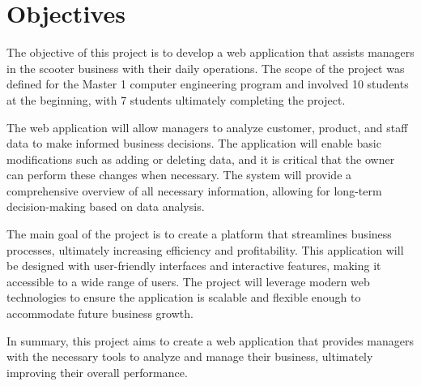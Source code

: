 \section{Objectives}
The objective of this project is to develop a web application that assists managers in the scooter business with their daily operations. The scope of the project was defined for the Master 1 computer engineering program and involved 10 students at the beginning, with 7 students ultimately completing the project. 

\vspace{10pt}

The web application will allow managers to analyze customer, product, and staff data to make informed business decisions. The application will enable basic modifications such as adding or deleting data, and it is critical that the owner can perform these changes when necessary. The system will provide a comprehensive overview of all necessary information, allowing for long-term decision-making based on data analysis.

\vspace{10pt}

The main goal of the project is to create a platform that streamlines business processes, ultimately increasing efficiency and profitability. This application will be designed with user-friendly interfaces and interactive features, making it accessible to a wide range of users. The project will leverage modern web technologies to ensure the application is scalable and flexible enough to accommodate future business growth.

\vspace{10pt}

In summary, this project aims to create a web application that provides managers with the necessary tools to analyze and manage their business, ultimately improving their overall performance.





